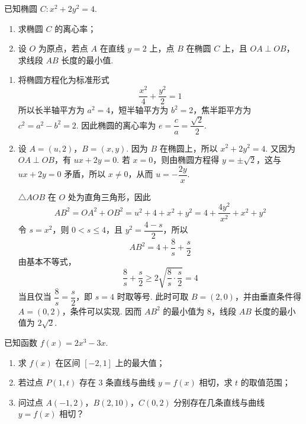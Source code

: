\begin{problem}
已知椭圆 \(C: x^{2} + 2y^{2} = 4\).

\begin{enumerate}
\item 求椭圆 \(C\) 的离心率；
\item 设 \(O\) 为原点，若点 \(A\) 在直线 \(y = 2\) 上，点 \(B\) 在椭圆 \(C\) 上，且 \(OA \perp OB\)，求线段 \(AB\) 长度的最小值.
\end{enumerate}
\end{problem}

\begin{solution}
\begin{enumerate}
\item 将椭圆方程化为标准形式
\[
\frac{x^2}{4}+\frac{y^2}{2}=1
\]
所以长半轴平方为 \(a^2=4\)，短半轴平方为 \(b^2=2\)，焦半距平方为
\(c^2=a^2-b^2=2\). 因此椭圆的离心率为
\(e=\dfrac{c}{a}=\dfrac{\sqrt{2}}{2}\).

\item 设 \(A=(u,2)\)，\(B=(x,y)\). 因为 \(B\) 在椭圆上，所以
\(x^2+2y^2=4\). 又因为 \(OA\perp OB\)，有
\(ux+2y=0\). 若 \(x=0\)，则由椭圆方程得 \(y=\pm\sqrt{2}\)，这与 \(ux+2y=0\) 矛盾，所以 \(x\ne0\)，从而 \(u=-\dfrac{2y}{x}\).

\(\triangle AOB\) 在 \(O\) 处为直角三角形，因此
\[
AB^2=OA^2+OB^2=u^2+4+x^2+y^2=4+\frac{4y^2}{x^2}+x^2+y^2
\]
令 \(s=x^2\)，则 \(0<s\leqslant4\)，且 \(y^2=\dfrac{4-s}{2}\)，所以
\[
AB^2=4+\frac{8}{s}+\frac{s}{2}
\]
由基本不等式，
\[
\frac{8}{s}+\frac{s}{2}\geqslant2\sqrt{\frac{8}{s}\cdot\frac{s}{2}}=4
\]
当且仅当 \(\dfrac{8}{s}=\dfrac{s}{2}\)，即 \(s=4\) 时取等号. 此时可取 \(B=(2,0)\)，并由垂直条件得 \(A=(0,2)\)，条件可以实现. 因而 \(AB^2\) 的最小值为 \(8\)，线段 \(AB\) 长度的最小值为 \(2\sqrt{2}\).
\end{enumerate}
\end{solution}

\begin{problem}
已知函数 \(f(x) = 2x^{3} - 3x\).

\begin{enumerate}
\item 求 \(f(x)\) 在区间 \([-2,1]\) 上的最大值；
\item 若过点 \(P(1,t)\) 存在 3 条直线与曲线 \(y = f(x)\) 相切，求 \(t\) 的取值范围；
\item 问过点 \(A(-1,2)\)，\(B(2,10)\)，\(C(0,2)\) 分别存在几条直线与曲线 \(y = f(x)\) 相切？
\end{enumerate}
\end{problem}

